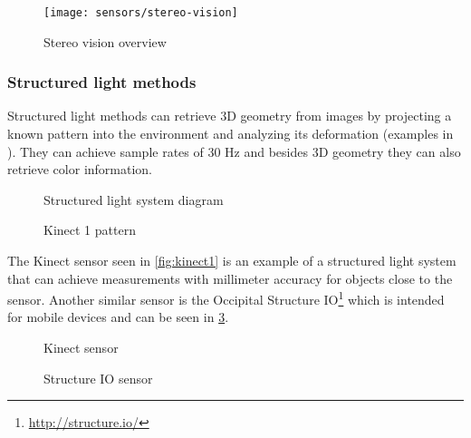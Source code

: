 \begin{figure}[H]
	\centering
	\texttt{[image: sensors/stereo-vision]}
	\caption[Stereo vision overview]{Stereo vision overview \cite{Yang2014}}
	\label{fig:stereo-vision}
\end{figure}


\subsubsection{Structured light methods}

Structured light methods can retrieve 3D geometry from images by projecting a known pattern into the environment and analyzing its deformation (examples in ). They can achieve sample rates of 30 Hz and besides 3D geometry they can also retrieve color information.


\begin{figure}[H]
	\begin{floatrow}[2]
		{\caption[Structured light system diagram]{Structured light system diagram\protect\footnotemark}\label{fig:structured-light}}
		{\caption[Kinect 1  pattern]{Kinect 1  pattern\protect\footnotemark}\label{fig:kinect1-ir}}
	\end{floatrow}
\end{figure}


The Kinect sensor seen in \cref{fig:kinect1} is an example of a structured light system that can achieve measurements with millimeter accuracy for objects close to the sensor. Another similar sensor is the Occipital Structure IO\footnote{\url{http://structure.io/}} which is intended for mobile devices and can be seen in \cref{fig:structure-io}.


\begin{figure}[H]
	\begin{floatrow}[2]
		{\caption[Kinect 2 sensor]{Kinect sensor\protect\footnotemark}\label{fig:kinect1}}
		{\caption[Structure IO sensor]{Structure IO sensor\protect\footnotemark}\label{fig:structure-io}}
	\end{floatrow}
\end{figure}


